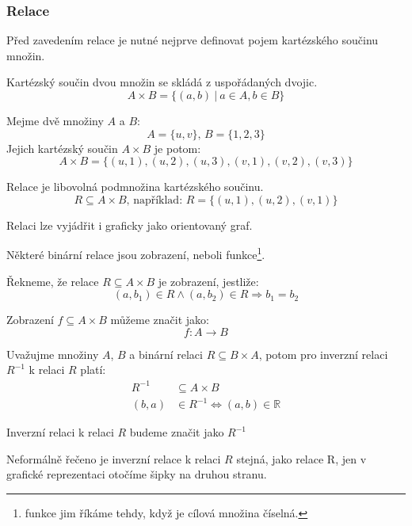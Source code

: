 \subsubsection*{Relace}
Před zavedením relace je nutné nejprve definovat pojem kartézského součinu množin.
\begin{definition} 
	Kartézský součin dvou množin se skládá z uspořádaných dvojic.
	$$A \times B = \{(a, b)\: | \: a \in A, b \in B\}$$
\end{definition}
\begin{example}
	Mejme dvě množiny $A$ a $B$:
    \[A = \{u, v\}
	\textrm{, }
	B = \{1, 2, 3\}\]
	Jejich kartézský součin $A\times B$ je potom:
	$$A \times B = \{(u, 1), (u, 2), (u, 3), (v, 1), (v, 2), (v, 3)\}$$
\end{example}

\begin{definition}[Relace]
    Relace je libovolná podmnožina kartézského součinu.
	$$R \subseteq A \times B \textrm{, například: } R = \{(u, 1), (u, 2), (v, 1)\}$$

	Relaci lze vyjádřit i graficky jako orientovaný graf.
\end{definition}


Některé binární relace jsou zobrazení, neboli funkce\footnote{funkce jim říkáme tehdy,
když je cílová množina číselná.}.

\begin{definition}[Zobrazení]
	Řekneme, že relace $R \subseteq A \times B$ je zobrazení, jestliže:
	$$(a, b_1) \in R \wedge (a, b_2) \in R \Rightarrow b_1 = b_2$$

	Zobrazení $f \subseteq A \times B$ můžeme značit jako:
	$$f: A \rightarrow B$$
\end{definition}


\begin{definition}
	Uvažujme množiny $A$, $B$ a binární relaci $R \subseteq B \times A$, potom pro
	inverzní relaci $R^{-1}$ k relaci $R$ platí:
	\begin{align*}
		R^{-1} &\subseteq A \times B\\
		(b, a) &\in R^{-1} \Leftrightarrow (a, b) \in \mathbb{R}
	\end{align*}

	Inverzní relaci k relaci $R$ budeme značit jako $R^{-1}$

	Neformálně řečeno je inverzní relace k relaci $R$ stejná, jako relace R,
	jen v grafické reprezentaci otočíme šipky na druhou stranu.
\end{definition}


